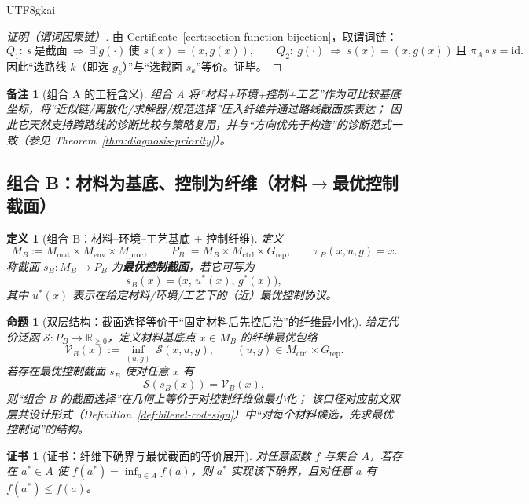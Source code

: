 \documentclass[12pt]{article}
\newtheorem{definition}{定义}[section]
\newtheorem{proposition}{命题}[section]
\newtheorem{remark}{备注}[section]
\newtheorem{certificate}{证书}[section]
\begin{document}
\begin{CJK*}{UTF8}{gkai}
\begin{proof}[证明（谓词因果链）]
由 Certificate~\ref{cert:section-function-bijection}，取谓词链：
\[
Q_1:\ s\ \text{是截面}\ \Rightarrow\ \exists! g(\cdot)\ \text{使 } s(x)=(x,g(x)),\qquad
Q_2:\ g(\cdot)\ \Rightarrow\ s(x)=(x,g(x))\ \text{且 }\pi_A\circ s=\mathrm{id}.
\]
因此“选路线 $k$（即选 $g_k$）”与“选截面 $s_k$”等价。证毕。
\end{proof}

\begin{remark}[组合 A 的工程含义]
组合 A 将“材料+环境+控制+工艺”作为可比较基底坐标，将“近似链/离散化/求解器/规范选择”压入纤维并通过路线截面族表达；
因此它天然支持跨路线的诊断比较与策略复用，并与“方向优先于构造”的诊断范式一致（参见 Theorem~\ref{thm:diagnosis-priority}）。
\end{remark}

\subsection{组合 B：材料为基底、控制为纤维（材料$\to$最优控制截面）}

\begin{definition}[组合 B：材料--环境--工艺基底 + 控制纤维]
\label{def:rtsc-bundle-B}
定义
\[
M_B:=M_{\mathrm{mat}}\times M_{\mathrm{env}}\times M_{\mathrm{proc}},
\qquad
P_B:=M_B\times M_{\mathrm{ctrl}}\times G_{\mathrm{rep}},
\qquad
\pi_B(x,u,g)=x.
\]
称截面 $s_B:M_B\to P_B$ 为\textbf{最优控制截面}，若它可写为
\[
s_B(x)=\bigl(x,\,u^\ast(x),\,g^\ast(x)\bigr),
\]
其中 $u^\ast(x)$ 表示在给定材料/环境/工艺下的（近）最优控制协议。
\end{definition}

\begin{proposition}[双层结构：截面选择等价于“固定材料后先控后治”的纤维最小化]
\label{prop:bundle-B-bilevel}
给定代价泛函 $\mathcal{S}:P_B\to\mathbb{R}_{\ge 0}$，定义材料基底点 $x\in M_B$ 的纤维最优包络
\[
\mathcal{V}_B(x):=\inf_{(u,g)}\ \mathcal{S}(x,u,g),
\qquad (u,g)\in M_{\mathrm{ctrl}}\times G_{\mathrm{rep}}.
\]
若存在最优控制截面 $s_B$ 使对任意 $x$ 有
\[
\mathcal{S}(s_B(x))=\mathcal{V}_B(x),
\]
则“组合 B 的截面选择”在几何上等价于对控制纤维做最小化；
该口径对应前文双层共设计形式（Definition~\ref{def:bilevel-codesign}）中“对每个材料候选，先求最优控制词”的结构。
\end{proposition}

\begin{certificate}[证书：纤维下确界与最优截面的等价展开]
\label{cert:bundle-B-bilevel}
对任意函数 $f$ 与集合 $A$，若存在 $a^\ast\in A$ 使 $f(a^\ast)=\inf_{a\in A}f(a)$，则 $a^\ast$ 实现该下确界，且对任意 $a$ 有 $f(a^\ast)\le f(a)$。
\end{certificate}


\end{CJK*}
\end{document}
